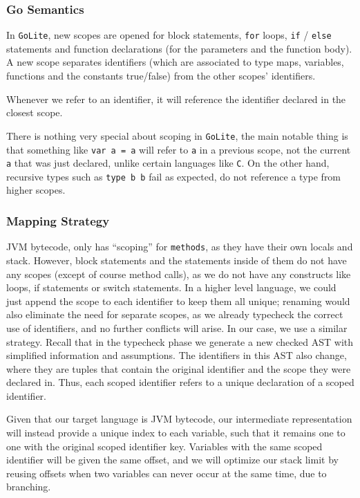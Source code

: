 \documentclass[11pt]{article}
\begin{document}
\subsubsection{Go Semantics}
\label{sec:org3187054}
In \texttt{GoLite}, new scopes are opened for block statements, \texttt{for}
loops, \texttt{if} / \texttt{else} statements and function declarations (for the
parameters and the function body). A new scope separates
identifiers (which are associated to type maps, variables,
functions and the constants true/false) from the other scopes'
identifiers.

Whenever we refer to an identifier, it will reference the
identifier declared in the closest scope.

There is nothing very special about scoping in \texttt{GoLite}, the main
notable thing is that something like \texttt{var a = a} will refer to \texttt{a}
in a previous scope, not the current \texttt{a} that was just declared,
unlike certain languages like \texttt{C}.
On the other hand, recursive types such as \texttt{type b b} fail as expected,
do not reference a type from higher scopes.
\subsubsection{Mapping Strategy}
\label{sec:org29b0448}
JVM bytecode, only has ``scoping'' for \texttt{methods}, as they have
their own locals and stack. However, block statements and the
statements inside of them do not have any scopes (except of course
method calls), as we do not have any constructs like loops, if
statements or switch statements. In a higher level language, we
could just append the scope to each identifier to keep them all
unique; renaming would also eliminate the need for separate scopes,
as we already typecheck the correct use of identifiers, and no further
conflicts will arise. In our case, we use a similar strategy. Recall that
in the typecheck phase we generate a new checked AST with
simplified information and assumptions. The identifiers in this
AST also change, where they are tuples that contain the original
identifier and the scope they were declared in. Thus, each scoped
identifier refers to a unique declaration of a scoped identifier.

Given that our target language is JVM bytecode, our intermediate
representation will instead provide a unique index to each variable,
such that it remains one to one with the original scoped identifier key.
Variables with the same scoped identifier will be given the same offset,
and we will optimize our stack limit by reusing offsets when two variables
can never occur at the same time, due to branching.
\end{document}
